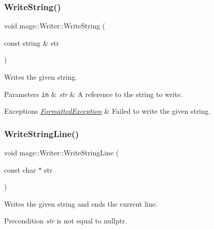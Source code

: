 \subsubsection{\texorpdfstring{Write\+String()}{WriteString()}\hspace{0.1cm}{\footnotesize\ttfamily [2/2]}}
{\footnotesize\ttfamily void mage\+::\+Writer\+::\+Write\+String (\begin{DoxyParamCaption}\item[{const string \&}]{str }\end{DoxyParamCaption})\hspace{0.3cm}{\ttfamily [protected]}}

Writes the given string.


\begin{DoxyParams}[1]{Parameters}
\mbox{\tt in}  & {\em str} & A reference to the string to write. \\
\hline
\end{DoxyParams}

\begin{DoxyExceptions}{Exceptions}
{\em \hyperlink{classmage_1_1_formatted_exception}{Formatted\+Exception}} & Failed to write the given string. \\
\hline
\end{DoxyExceptions}
\hypertarget{classmage_1_1_writer_ad53f69e0f722c4d4b8b320ea39770c1a}{}\label{classmage_1_1_writer_ad53f69e0f722c4d4b8b320ea39770c1a} 
\subsubsection{\texorpdfstring{Write\+String\+Line()}{WriteStringLine()}\hspace{0.1cm}{\footnotesize\ttfamily [1/2]}}
{\footnotesize\ttfamily void mage\+::\+Writer\+::\+Write\+String\+Line (\begin{DoxyParamCaption}\item[{const char $\ast$}]{str }\end{DoxyParamCaption})\hspace{0.3cm}{\ttfamily [protected]}}

Writes the given string and ends the current line.

\begin{DoxyPrecond}{Precondition}
{\itshape str} is not equal to {\ttfamily nullptr}. 
\end{DoxyPrecond}

